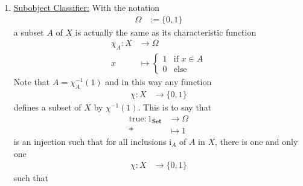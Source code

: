 \begin{exa}
\begin{enumerate}
This can be generalized to an arbitrary category $\mathbf{C}$.
We say two monomorphisms
\begin{align*}
  m_{1}
  &\in
  \mathrm{mor}_{\mathbf{C}}(X_{1},X)
  \\
  m_{2}
  &\in
  \mathrm{mor}_{\mathbf{C}}(X_{2},X)
\end{align*}
are equivalent if there is an isomorphism $f_{12}$ such that the diagram
\[
\begin{tikzcd}[sep=huge]
  X_{1}
  \arrow{rr}{f_{12}}
  \arrow[swap]{rd}{m_{1}}
  &
  &
  X_{2}
  \arrow{dl}{m_{2}}
  \\
  &
  X
\end{tikzcd}
\]
commutes.
This defines an equivalence relation $\sim$ on the set of monomorphisms of $\mathbf{C}$, denoted $\mathrm{Mono}_{\mathbf{C}}$.
An element $[m]$ of $\mathrm{Mono}_{\mathbf{C}} \slash \sim$ is called a \textbf{subobject (of $\mathrm{cod}_{\mathbf{C}}(m)$)}.
\item[$\bullet$]
\underline{Subobject Classifier:}
With the notation
\begin{align*}
  \Omega
  &:=
  \lbrace
    0,
    1
  \rbrace
\end{align*}
a subset $A$ of $X$ is actually the same as its characteristic function
\begin{align*}
  \chi_{A}
  \colon
  X
  &\rightarrow
  \Omega
  \\
  x
  &\mapsto
  \begin{cases}
    1
    &
    \text{if }
    x
    \in
    A
    \\
    0
    &
    \text{else}
  \end{cases}
\end{align*}
Note that $A = \chi_{A}^{-1}(1)$ and in this way any function
\begin{align*}
  \chi
  \colon
  X
  &\rightarrow
  \lbrace
    0,
    1
  \rbrace
\end{align*}
defines a subset of $X$ by $\chi^{-1}(1)$.
This is to say that
\begin{align*}
  \mathrm{true}
  \colon
  1_{\mathbf{Set}}
  &\rightarrow
  \Omega
  \\
  \ast
  &\mapsto
  1
\end{align*}
is an injection such that for all inclusions $\mathrm{i}_{A}$ of $A$ in $X$, there is one and only one
\begin{align*}
  \chi
  \colon
  X
  &\rightarrow
  \lbrace
    0,
    1
  \rbrace
\end{align*}
such that
\begin{align*}

\end{align*}
\end{enumerate}
\end{exa}
